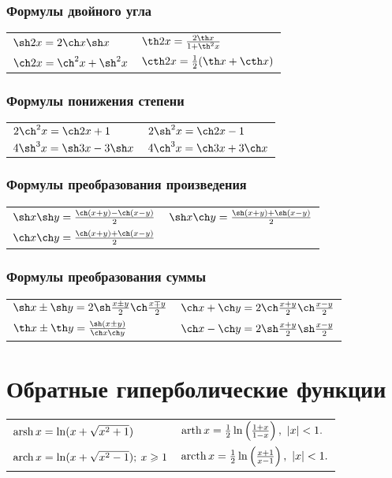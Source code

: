 \subsubsection{Формулы двойного угла}
\begin{longtable}[l]{l l}
$\sh 2x = 2\ch x\sh x$
&
$\th 2x = \frac{2\th x}{1 + \th^2 x}$
\\
$\ch 2x = \ch^2 x + \sh^2 x$
&
$\cth 2x = \frac{1}{2}(\th x + \cth x)$
\end{longtable}

\subsubsection{Формулы понижения степени}
\begin{longtable}[l]{l l}
$2\ch^2 x = \ch 2x + 1$
&
$2\sh^2 x = \ch 2x - 1$
\\
$4\sh^3 x = \sh 3x - 3 \sh x$
&
$4 \ch^3 x = \ch 3x + 3 \ch x$
\end{longtable}

\subsubsection{Формулы преобразования произведения}
\begin{longtable}[l]{ l l}
$\sh x \sh y = \frac{\ch(x + y) - \ch (x - y)}{2}$
&
$\sh x \ch y = \frac{\sh(x + y) + \sh(x - y)}{2}$
\\
$\ch x \ch y = \frac{\ch(x + y) + \ch(x - y)}{2}$
\end{longtable}

\subsubsection{Формулы преобразования суммы}
\begin{longtable}[l]{l  l}
$\sh x \pm \sh y = 2 \sh\frac{x \pm y}{2} \ch\frac{x \mp y}{2}$
&
$\ch x + \ch y = 2 \ch\frac{x + y}{2}\ch\frac{x - y}{2}$
\\
$\th x \pm \th y = \frac{\sh(x \pm y)}{\ch x \ch y}$
&
$\ch x - \ch y = 2 \sh\frac{x + y}{2}\sh\frac{x - y}{2}$
\end{longtable}

\section{Обратные гиперболические функции}

\begin{longtable}[l]{l l}
$\operatorname{arsh} x = \ln(x + \sqrt{x^2 + 1})$
&
$\arth x = \frac{1}{2}\ln \left(\frac{1 + x}{1 - x} \right),\ |x|<1.$
\\
$\operatorname{arch} x = \ln(x + \sqrt{x^2 - 1}); \: x \geqslant 1$
&
$\arcth x = \frac{1}{2}\ln \left( \frac{x+ 1}{x - 1} \right),\ |x|<1.$
\end{longtable}

